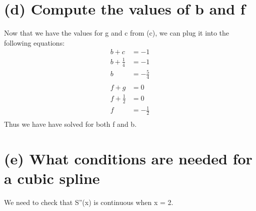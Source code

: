 \documentclass[12pt]{article}
\begin{document}
\begin{adjustwidth}{0em}{0pt}
\section*{(d) Compute the values of b and f}
Now that we have the values for g and c from (c), we can plug it into the following equations:
\begin{align*}
   b + c &= -1 \\
             b + \frac{1}{4} &= -1 \\
             b  &= -\frac{5}{4} \\\\
   f + g &= 0 \\
             f + \frac{1}{2} &= 0 \\
             f  &= -\frac{1}{2} \\
\end{align*}
Thus we have have solved for both f and b.

\section*{(e) What conditions are needed for a cubic spline}
We need to check that S''(x) is continuous when x = 2.
\end{adjustwidth}
\end{document}
